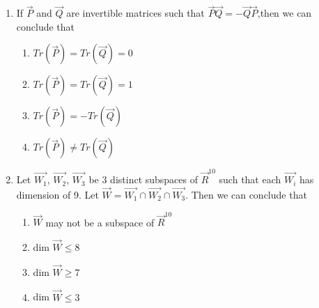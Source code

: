 \begin{enumerate}[label=\thesection.\arabic*.,ref=\thesection.\theenumi]
\item If $\vec{P}$ and $\vec{Q}$ are invertible matrices such that   
$\vec{P}\vec{Q} = -\vec{Q}\vec{P}$,then we can conclude that
\begin{enumerate}
\item  $Tr(\vec{P})=Tr(\vec{Q})=0$ \label{eq:solutions/2016/dec/75/1}
\item  $Tr(\vec{P})=Tr(\vec{Q})=1$ \label{eq:solutions/2016/dec/75/2}
\item  $Tr(\vec{P})=-Tr(\vec{Q})$ \label{eq:solutions/2016/dec/75/3}
\item  $Tr(\vec{P}) \neq Tr(\vec{Q})$ \label{eq:solutions/2016/dec/75/4}
\end{enumerate}
%
%
\solution

\twocolumn
\item Let $\vec{W_1}$, $\vec{W_2}$, $\vec{W_3}$ be 3 distinct subspaces of $\vec{R}^{10}$ such that each $\vec{W_i}$ has dimension of 9. Let $\vec{W} = \vec{W_1} \cap \vec{W_2} \cap \vec{W_3}$. Then we can conclude that\\
\begin{enumerate}
\item $\vec{W}$ may not be a subspace of $\vec{R}^{10}$\\
\item dim $\vec{W} \leq 8$\\
\item dim $\vec{W} \geq 7$\\
\item  dim $\vec{W} \leq 3$\\
\end{enumerate}
\solution

\twocolumn



\end{enumerate}
